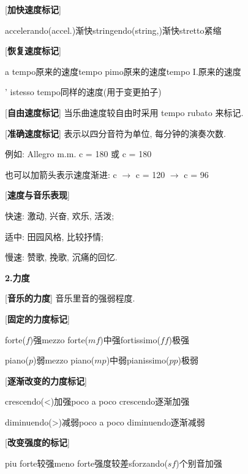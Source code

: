 [\textbf{加快速度标记}]\par
\qquad accelerando(accel.)\quad 渐快\qquad stringendo(string,)\quad 渐快\qquad stretto\quad 紧缩\par

[\textbf{恢复速度标记}]\par
\qquad a tempo\quad 原来的速度\qquad tempo pimo\quad 原来的速度\qquad tempo I.\quad 原来的速度\par
{}' istesso tempo\quad 同样的速度(用于变更拍子)\par

[\textbf{自由速度标记}] 当乐曲速度较自由时采用 tempo rubato 来标记.\par

[\textbf{准确速度标记}] 表示以四分音符为单位, 每分钟的演奏次数.\par
\qquad 例如: Allegro m.m. \qa c \quad = 180 或 \qa c \quad = 180\par
\qquad 也可以加箭头表示速度渐进: \qa c  $\rightarrow$ \qa c \quad = 120 $\rightarrow$ \qa c \quad = 96 \par

\clearpage

[\textbf{速度与音乐表现}]\par
\qquad 快速: 激动, 兴奋, 欢乐, 活泼;\par
\qquad 适中: 田园风格, 比较抒情;\par
\qquad 慢速: 赞歌, 挽歌, 沉痛的回忆.\par

\begin{center}
 \textbf{2.力度}\\
\end{center}

[\textbf{音乐的力度}] 音乐里音的强弱程度.\par

[\textbf{固定的力度标记}]\par
\qquad forte($f$)\quad 强\qquad mezzo forte($mf$)\quad 中强\qquad fortissimo($ff$)\quad 极强\par
\qquad piano($p$)\quad 弱\qquad mezzo piano($mp$)\quad 中弱\qquad pianissimo($pp$)\quad 极弱\par

[\textbf{逐渐改变的力度标记}]\par
\qquad crescendo(<)\quad 加强\qquad poco a poco crescendo\quad 逐渐加强\par
\qquad diminuendo(>)\quad 减弱\qquad poco a poco diminuendo\quad 逐渐减弱\par

[\textbf{改变强度的标记}]\par
\qquad piu forte\quad 较强\qquad meno forte\quad 强度较差\qquad sforzando($sf$)\quad 个别音加强\par


